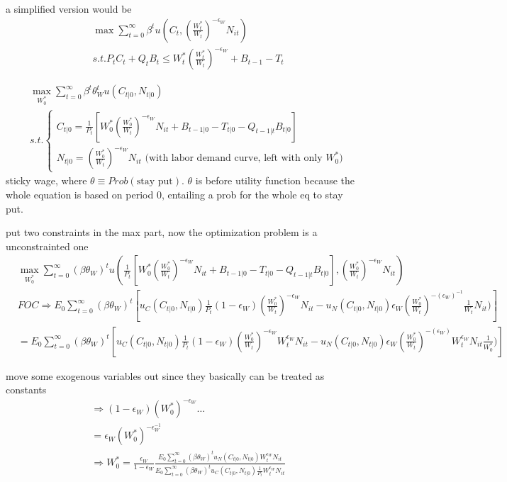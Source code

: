 \documentclass{article}
\begin{document}
a simplified version would be 
\begin{equation}
\begin{split}
& \max \sum\limits_{t=0}^{\infty}\beta^t u(C_t,(\frac{W_t^*}{W_t})^{-\epsilon_W}N_{it})
\\& s.t. P_t C_t +Q_t B_t \leqslant W_t^*(\frac{W_t^*}{W_t})^{-\epsilon_W}+B_{t-1}-T_t
\end{split}
\end{equation}


\begin{equation}
\begin{split}
& \max\limits_{W^*_0}  \sum\limits_{t=0}^{\infty}\beta^t \theta_W^t u(C_{t|0},N_{t|0})
\\& s.t. 
\begin{cases}
C_{t|0}=\frac{1}{P_t}[W_0^* (\frac{W_0^*}{W_t})^{-\epsilon_W}N_{it}+B_{t-1|0}-T_{t|0}-Q_{t-1|t}B_{t|0}]
\\
N_{t|0}=(\frac{W^*_0}{W_t})^{-\epsilon_W} N_{it} \text{ (with labor demand curve, left with only $W^*_0$)}
\end{cases}
\end{split}
\end{equation}
sticky wage, where $\theta \equiv Prob(\text{stay put})$. $\theta$ is before utility function because the whole equation is based on period 0, entailing a prob for the whole eq to stay put.


put two constraints in the max part, now the optimization problem is a unconstrainted one
\begin{align}
& \max_{W_0^*} \sum\limits_{t=0}^{\infty} (\beta \theta_W )^t 
u(
{\frac{1}{P_t}[W_0^* (\frac{W_0^*}{W_t})^{-\epsilon_W}N_{it}+B_{t-1|0}-T_{t|0}-Q_{t-1|t}B_{t|0}]},
(\frac{W^*_0}{W_t})^{-\epsilon_W} N_{it}
)
\\& FOC \Rightarrow E_0 \sum\limits_{t=0}^{\infty} (\beta \theta_W)^t [u_C(C_{t|0},N_{t|0})\frac{1}{P_t}(1-\epsilon_W)(\frac{W_0^*}{W_t})^{-\epsilon_W}N_{it}-
u_N(C_{t|0},N_{t|0}) \epsilon_W (\frac{W_0^*}{W_t})^{-(\epsilon_W)^{-1}} \frac{1}{W_t} N_{it})
]
\\& = E_0 \sum_{t=0}^{\infty} (\beta \theta_W)^t [u_C(C_{t|0},N_{t|0})\frac{1}{P_t}(1-\epsilon_W) (\frac{W_0^*}{W_t})^{-\epsilon_W} W_t^{\epsilon_W} N_{it}-
u_N(C_{t|0},N_{t|0}) \epsilon_W (\frac{W_0^*}{W_t})^{-(\epsilon_W)} W_t^{\epsilon_W} N_{it} \frac{1}{W_0^*})
]
\end{align}

move some exogenous variables out since they basically can be treated as constants
\begin{align}
& \Rightarrow  (1-\epsilon_W)(W_0^*)^{-\epsilon_W} \dots  
\\& = \epsilon_W (W_0^*)^{-\epsilon_W^{-1}}
\\& \Rightarrow W_0^*=\frac{\epsilon_W}{1-\epsilon_W}
\frac{E_0 \sum\limits_{t=0}^{\infty} (\beta \theta_W)^t u_N(C_{t|0},N_{t|0})W_t^{\epsilon_W}N_{it}}{E_0 \sum\limits_{t=0}^{\infty} (\beta \theta_W)^t u_C(C_{t|0},N_{t|0})\frac{1}{P_t} W_t^{\epsilon_W} N_{it}}
\end{align}
\end{document}
